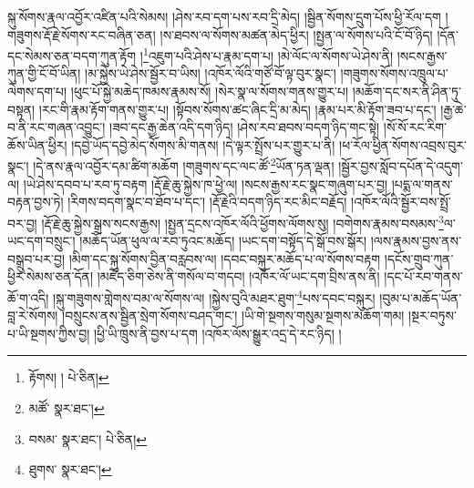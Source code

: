 སྐུ་སོགས་རྣལ་འབྱོར་འཛིན་པའི་སེམས། །ཤེས་རབ་དག་པས་རབ་དྲི་མེད། །སྦྱིན་སོགས་དྲུག་པོས་ཕྱི་རོལ་དག །གཟུགས་རྡོ་རྗེ་སོགས་རང་བཞིན་ཅན། །ས་ཐབས་ལ་སོགས་མཚན་མེད་ཕྱིར། །སྤྱན་ལ་སོགས་པའི་ངོ་བོ་ཉིད། །དོན་དང་སེམས་ཅན་བདག་ཀུན་རྟོག །\footnote{རྟོགས། །  པེ་ཅིན། }འཇུག་པའི་ཤེས་པ་རྣམ་དག་པ། །མེ་ལོང་ལ་སོགས་ཡེ་ཤེས་ནི། །སངས་རྒྱས་ཀུན་གྱི་ངོ་བོ་ཡིན། །མ་སྐྱེས་ཡེ་ཤེས་སྦྱོར་བ་ཡིས། །འཁོར་ལོའི་གཙོ་བོ་ལྟ་བུར་སྣང་། །གཟུགས་སོགས་འཁྲུལ་པ་ལེགས་དག་པ། །ཕུང་པོ་སྐྱེ་མཆེད་ཁམས་རྣམས་སོ། །སེར་སྣ་ལ་སོགས་གནས་གྱུར་པ། །མཆོག་དང་སར་ནི་ཤིན་ཏུ་བསྟན། །རང་གི་རྣམ་རྟོག་གནས་གྱུར་པ། །སྟོབས་སོགས་ཚང་ཞིང་དྲི་མ་མེད། །རྣམ་པར་མི་རྟོག་ཟབ་པ་དང་། །རྒྱ་ཆེ་བ་ནི་རང་གཞན་འབྱུང་། །ཟབ་དང་རྒྱ་ཆེན་འདི་དག་ཉིད། །ཤེས་རབ་ཐབས་བདག་ཉིད་གང་སྟེ། །སོ་སོ་རང་རིག་ཆོས་ཡིན་ཕྱིར། །དབྱེ་ཡོད་དབྱེ་མེད་སོགས་མི་གནས། །དེ་ལྟར་སྤྲོས་པར་གྱུར་པ་ནི། །ཕ་རོལ་ཕྱིན་སོགས་འབྲས་བུར་སྣང་། །དེ་ནས་རྣལ་འབྱོར་དམ་ཚིག་མཆོག །གཟུགས་དང་ལང་ཚོ་\footnote{མཚོ་  སྣར་ཐང་། }ཡོན་ཏན་ལྡན། །སྦྱོར་བྱས་སློབ་དཔོན་དེ་འདུག་ལ། །ཡེ་ཤེས་དབབ་པ་རབ་ཏུ་བརྟག །རྡོ་རྗེ་ཆུ་སྐྱེས་ཁ་ཕྱེ་ལ། །སངས་རྒྱས་རང་སྣང་གཞུག་པར་བྱ། །པདྨ་ལ་གནས་བརྟན་བྱས་ཏེ། །རིགས་བདག་སྣང་བ་ཐོབ་པ་དང་། །རྡོ་རྗེའི་བདག་ཉིད་རང་མིང་བརྗོད། །འཁོར་ལོའི་སྦྱོར་བས་སྤྲོ་བར་བྱ། །རྡོ་རྗེ་ཆུ་སྐྱེས་སྒྲས་སངས་རྒྱས། །སྤྱན་དྲངས་འཁོར་ལོའི་ཕྱོགས་ལོགས་སུ། །བགེགས་རྣམས་བསམས་\footnote{བསམ་  སྣར་ཐང་།  པེ་ཅིན། }ལ་ཡང་དག་བསྲུང་། །མཆོད་ཡོན་ཕུལ་ལ་རབ་ཏུའང་མཆོད། །ཡང་དག་བསྟོད་དེ་སྒོ་བས་སྒོར། །ལས་རྣམས་བྱས་ནས་བསྒྲུབ་པར་བྱ། །མིག་དང་སྐུ་སོགས་བྱིན་བརླབས་ལ། །དབང་བསྐུར་མཆོད་པ་ལ་སོགས་བརྟག །དངོས་གྲུབ་ཀུན་ཕྱིར་སེམས་ཅན་དོན། །མཛོད་ཅིག་ཅེས་ནི་གསོལ་བ་གདབ། །འཁོར་ལོ་ཡང་དག་བྲིས་ནས་ནི། །དང་པོ་རབ་གནས་ཆོ་ག་འདི། །སྐུ་གཟུགས་གླེགས་བམ་ལ་སོགས་ལ། །སྐྱེས་བུའི་མཐར་ཐུག་\footnote{ཐུགས་  སྣར་ཐང་། }པས་དབང་བསྐུར། །བུམ་པ་མཆོད་ཡོན་བླ་རེ་སོགས། །བསྲུངས་ནས་སྦྱིན་སྲེག་སོགས་བཤད་གང་། །ཡི་གེ་སྔགས་གསུམ་སྔགས་མཆོག་གམ། །སྔར་བཏུས་པ་ཡི་སྔགས་ཀྱིས་བྱ། །ཕྱི་ཡི་ཁྲུས་ནི་བྱས་པ་དག །འཁོར་ལོས་སྒྱུར་འདྲ་དེ་རང་ཉིད། །
